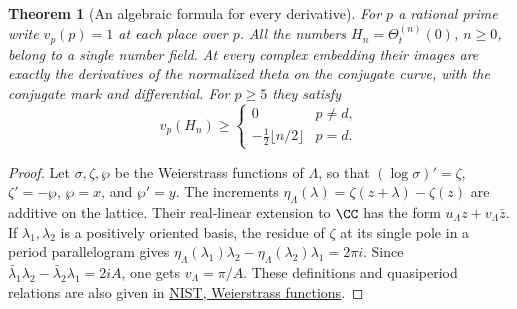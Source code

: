 \documentclass[a4paper,11pt]{article}
\newtheorem{theorem}[proposition]{Theorem}
\theoremstyle{definition}
\theoremstyle{remark}
\numberwithin{equation}{section}
\begin{document}
\begin{theorem}[An algebraic formula for every derivative]\label{thm:germ57}
For \(p\) a rational prime write \(v_p(p)=1\) at each place over
\(p\). All the numbers \(H_n=\Theta_t^{(n)}(0)\), \(n\ge0\),
belong to a single number field. At every complex embedding their
images are exactly the derivatives of the normalized theta on the
conjugate curve, with the conjugate mark and differential.
For \(p\ge5\) they satisfy
\[
       v_p(H_n)\ge
          \begin{cases}
             0 & p\ne d,\\
             -\tfrac12\lfloor n/2\rfloor & p=d .
          \end{cases}                                      \label{eq:ellval57}
\]
\end{theorem}
\begin{proof}
Let \(\sigma,\zeta,\wp\) be the Weierstrass functions of
\(\Lambda\), so that \((\log\sigma)'=\zeta\), \(\zeta'=-\wp\),
\(\wp=x\), and \(\wp'=y\). The increments
\(\eta_\Lambda(\lambda)=\zeta(z+\lambda)-\zeta(z)\) are additive
on the lattice. Their real-linear extension to \(\CC\) has the
form \(u_\Lambda z+v_\Lambda\bar z\). If
\(\lambda_1,\lambda_2\) is a positively oriented basis, the
residue of \(\zeta\) at its single pole in a period parallelogram
gives
\(\eta_\Lambda(\lambda_1)\lambda_2
-\eta_\Lambda(\lambda_2)\lambda_1=2\pi i\).
Since \(\bar\lambda_1\lambda_2-\bar\lambda_2\lambda_1=2iA\),
one gets \(v_\Lambda=\pi/A\). These definitions and
quasiperiod relations are also given in
\href{https://dlmf.nist.gov/23.2}{NIST, Weierstrass functions}.


\end{proof}
\end{document}
